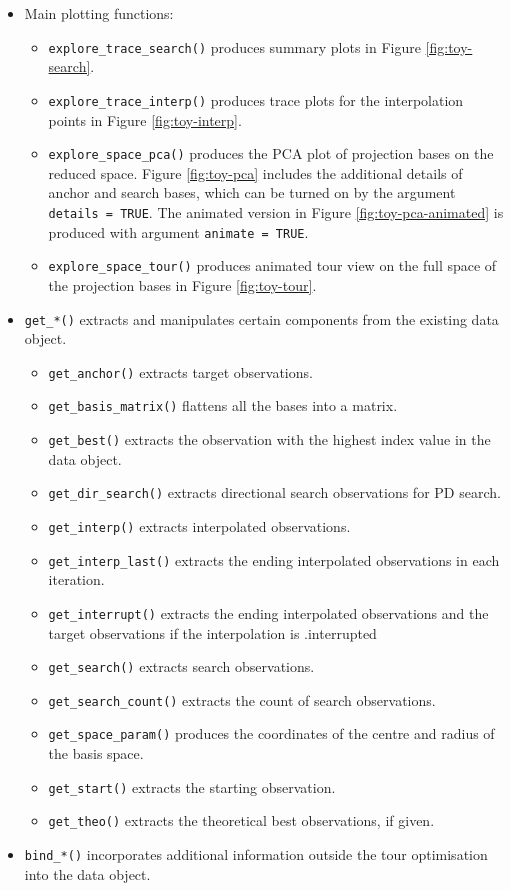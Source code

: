 \begin{itemize}
\item
  Main plotting functions:

  \begin{itemize}
  \tightlist
  \item
    \texttt{explore\_trace\_search()} produces summary plots in Figure
    \ref{fig:toy-search}.
  \item
    \texttt{explore\_trace\_interp()} produces trace plots for the
    interpolation points in Figure \ref{fig:toy-interp}.
  \item
    \texttt{explore\_space\_pca()} produces the PCA plot of projection
    bases on the reduced space. Figure \ref{fig:toy-pca} includes the
    additional details of anchor and search bases, which can be turned
    on by the argument \texttt{details\ =\ TRUE}. The animated version
    in Figure \ref{fig:toy-pca-animated} is produced with argument
    \texttt{animate\ =\ TRUE}.
  \item
    \texttt{explore\_space\_tour()} produces animated tour view on the
    full space of the projection bases in Figure \ref{fig:toy-tour}.
  \end{itemize}
\item
  \texttt{get\_*()} extracts and manipulates certain components from the
  existing data object.

  \begin{itemize}
  \tightlist
  \item
    \texttt{get\_anchor()} extracts target observations.
  \item
    \texttt{get\_basis\_matrix()} flattens all the bases into a matrix.
  \item
    \texttt{get\_best()} extracts the observation with the highest index
    value in the data object.
  \item
    \texttt{get\_dir\_search()} extracts directional search observations
    for PD search.
  \item
    \texttt{get\_interp()} extracts interpolated observations.
  \item
    \texttt{get\_interp\_last()} extracts the ending interpolated
    observations in each iteration.
  \item
    \texttt{get\_interrupt()} extracts the ending interpolated
    observations and the target observations if the interpolation is
    .interrupted
  \item
    \texttt{get\_search()} extracts search observations.
  \item
    \texttt{get\_search\_count()} extracts the count of search
    observations.
  \item
    \texttt{get\_space\_param()} produces the coordinates of the centre
    and radius of the basis space.
  \item
    \texttt{get\_start()} extracts the starting observation.
  \item
    \texttt{get\_theo()} extracts the theoretical best observations, if
    given.
  \end{itemize}
\item
  \texttt{bind\_*()} incorporates additional information outside the
  tour optimisation into the data object.


\end{itemize}
